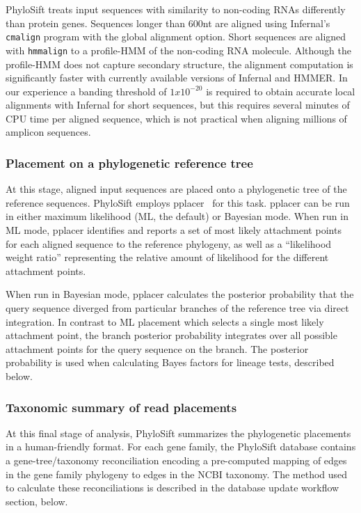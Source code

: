 \documentclass[10pt]{article}
\begin{document}
PhyloSift treats input sequences with similarity to non-coding {RNA}s differently than protein genes.
Sequences longer than 600nt are aligned using Infernal's \texttt{cmalign} program with the global alignment option.
Short sequences are aligned with \texttt{hmmalign} to a profile-HMM of the non-coding RNA molecule.
Although the profile-HMM does not capture secondary structure, the alignment computation is significantly faster with currently available versions of Infernal and HMMER.
In our experience a banding threshold of $1x10^{-20}$ is required to obtain accurate local alignments with Infernal for short sequences, but this requires several minutes of CPU time per aligned sequence, which is not practical when aligning millions of amplicon sequences.

\subsubsection*{Placement on a phylogenetic reference tree}

At this stage, aligned input sequences are placed onto a phylogenetic tree of the reference sequences.
PhyloSift employs pplacer~\cite{Matsen2010} for this task.
pplacer can be run in either maximum likelihood (ML, the default) or Bayesian mode.
When run in ML mode, pplacer identifies and reports a set of most likely attachment points for each aligned sequence to the reference phylogeny, as well as a ``likelihood weight ratio'' representing the relative amount of likelihood for the different attachment points.

When run in Bayesian mode, pplacer calculates the posterior probability that the query sequence diverged from particular branches of the reference tree via direct integration.
In contrast to ML placement which selects a single most likely attachment point, the branch posterior probability integrates over all possible attachment points for the query sequence on the branch.
The posterior probability is used when calculating Bayes factors for lineage tests, described below.

\subsubsection*{Taxonomic summary of read placements}
At this final stage of analysis, PhyloSift summarizes the phylogenetic placements in a human-friendly format.
For each gene family, the PhyloSift database contains a gene-tree/taxonomy reconciliation encoding a pre-computed mapping of edges in the gene family phylogeny to edges in the NCBI taxonomy. %
The method used to calculate these reconciliations is described in the database update workflow section, below.
\end{document}
